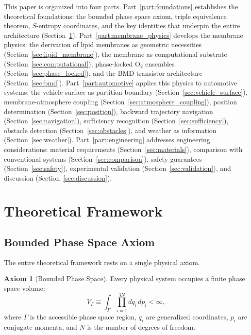 \documentclass[12pt]{article}
\theoremstyle{definition}
\newtheorem{axiom}{Axiom}
\theoremstyle{remark}
\newcommand{\VGamma}{V_{\Gamma}}
\begin{document}
This paper is organized into four parts. Part~\ref{part:foundations} establishes the theoretical foundations: the bounded phase space axiom, triple equivalence theorem, $S$-entropy coordinates, and the key identities that underpin the entire architecture (Section~\ref{sec:framework}). Part~\ref{part:membrane_physics} develops the membrane physics: the derivation of lipid membranes as geometric necessities (Section~\ref{sec:lipid_membrane}), the membrane as computational substrate (Section~\ref{sec:computational}), phase-locked $\mathrm{O}_2$ ensembles (Section~\ref{sec:phase_locked}), and the BMD transistor architecture (Section~\ref{sec:bmd}). Part~\ref{part:automotive} applies this physics to automotive systems: the vehicle surface as partition boundary (Section~\ref{sec:vehicle_surface}), membrane-atmosphere coupling (Section~\ref{sec:atmosphere_coupling}), position determination (Section~\ref{sec:position}), backward trajectory navigation (Section~\ref{sec:navigation}), sufficiency recognition (Section~\ref{sec:sufficiency}), obstacle detection (Section~\ref{sec:obstacles}), and weather as information (Section~\ref{sec:weather}). Part~\ref{part:engineering} addresses engineering considerations: material requirements (Section~\ref{sec:materials}), comparison with conventional systems (Section~\ref{sec:comparison}), safety guarantees (Section~\ref{sec:safety}), experimental validation (Section~\ref{sec:validation}), and discussion (Section~\ref{sec:discussion}).


\section{Theoretical Framework}
\label{sec:framework}

\subsection{Bounded Phase Space Axiom}

The entire theoretical framework rests on a single physical axiom.

\begin{axiom}[Bounded Phase Space]
\label{ax:bounded}
Every physical system occupies a finite phase space volume:
\begin{equation}
  \VGamma \equiv \int_{\Gamma} \prod_{i=1}^{3N} dq_i\, dp_i < \infty,
  \label{eq:bounded_phase}
\end{equation}
where $\Gamma$ is the accessible phase space region, $q_i$ are generalized coordinates, $p_i$ are conjugate momenta, and $N$ is the number of degrees of freedom.
\end{axiom}
\end{document}
